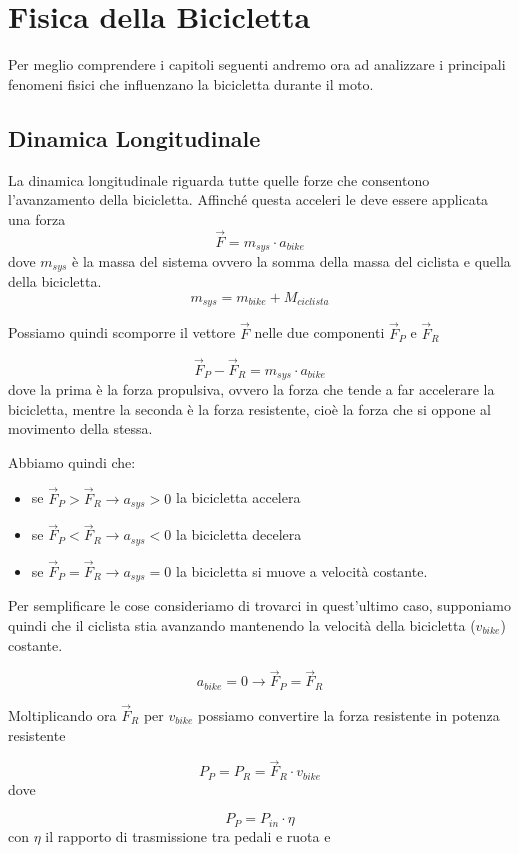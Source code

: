 \documentclass[class=article]{standalone}
\begin{document}
	
	\section{Fisica della Bicicletta}
	Per meglio comprendere i capitoli seguenti andremo ora ad analizzare i principali fenomeni fisici che influenzano la bicicletta durante il moto.
	
	\subsection{Dinamica Longitudinale}
	La dinamica longitudinale riguarda tutte quelle forze che consentono l'avanzamento della bicicletta. Affinché questa acceleri le deve essere applicata una forza
	\[\vec{F}=m_{sys}\cdot a_{bike}\]
	dove \(m_{sys}\) è la massa del sistema ovvero la somma della massa del ciclista e quella della bicicletta.
	\[m_{sys}=m_{bike}+M_{ciclista}\]
	
	Possiamo quindi scomporre il vettore \(\vec{F}\) nelle due componenti \(\vec{F}_{P}\) e \(\vec{F}_{R}\)
	
	\[\vec{F}_{P}-\vec{F}_{R}=m_{sys}\cdot a_{bike}\]
	dove la prima è la forza propulsiva, ovvero la forza che tende a far accelerare la bicicletta, mentre la seconda è la forza resistente, cioè la forza che si oppone al movimento della stessa.
	
	Abbiamo quindi che:
	\begin{itemize}
		\item se \(\vec{F}_{P}>\vec{F}_{R} \rightarrow a_{sys}>0\) la bicicletta accelera
		\item se \(\vec{F}_{P}<\vec{F}_{R} \rightarrow a_{sys}<0\) la bicicletta decelera
		\item se \(\vec{F}_{P}=\vec{F}_{R} \rightarrow a_{sys}=0\) la bicicletta si muove a velocità costante.
	\end{itemize}
	
	Per semplificare le cose consideriamo di trovarci in quest'ultimo caso, supponiamo quindi che il ciclista stia avanzando mantenendo la velocità della bicicletta (\(v_{bike}\)) costante.
		
	\[a_{bike}=0 \rightarrow \vec{F}_{P}=\vec{F}_{R}\]
	
	Moltiplicando ora \(\vec{F}_{R}\) per \(v_{bike}\) possiamo convertire la forza resistente in potenza resistente
	
	\[P_{P}=P_{R}=\vec{F}_{R}\cdot v_{bike}\]
	dove 
	
	\[P_{P}=P_{in}\cdot\eta\]
	con \(\eta\) il rapporto di trasmissione tra pedali e ruota e
	
\end{document}
